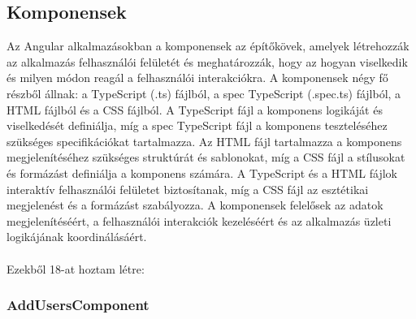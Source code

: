 
\subsection{Komponensek}

Az Angular alkalmazásokban a komponensek az építőkövek, amelyek létrehozzák az alkalmazás felhasználói felületét és meghatározzák, hogy az hogyan viselkedik és milyen módon reagál a felhasználói interakciókra. A komponensek négy fő részből állnak: a TypeScript (.ts) fájlból, a spec TypeScript (.spec.ts) fájlból, a HTML fájlból és a CSS fájlból. A TypeScript fájl a komponens logikáját és viselkedését definiálja, míg a spec TypeScript fájl a komponens teszteléséhez szükséges specifikációkat tartalmazza. Az HTML fájl tartalmazza a komponens megjelenítéséhez szükséges struktúrát és sablonokat, míg a CSS fájl a stílusokat és formázást definiálja a komponens számára. A TypeScript és a HTML fájlok interaktív felhasználói felületet biztosítanak, míg a CSS fájl az esztétikai megjelenést és a formázást szabályozza. A komponensek felelősek az adatok megjelenítéséért, a felhasználói interakciók kezeléséért és az alkalmazás üzleti logikájának koordinálásáért.\\
\\
Ezekből 18-at hoztam létre:

\subsubsection{AddUsersComponent}

